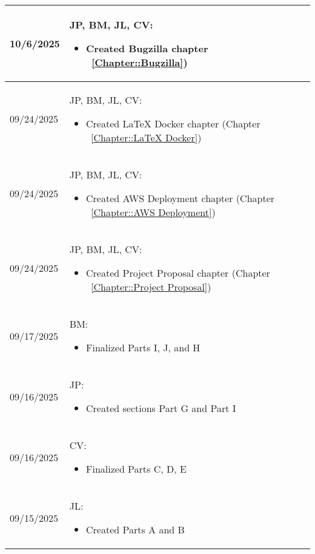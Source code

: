 \begin{longtable}{|l||p{13.5cm}|}
10/6/2025 & JP, BM, JL, CV:
\begin{itemize}[topsep=0pt,itemsep=0pt,parsep=0pt,partopsep=0pt,leftmargin=12pt]
\item Created Bugzilla chapter
~\ref{Chapter::Bugzilla})
\end{itemize} 
\\ \hline

09/24/2025 & JP, BM, JL, CV:
\begin{itemize}[topsep=0pt,itemsep=0pt,parsep=0pt,partopsep=0pt,leftmargin=12pt]
\item Created LaTeX Docker chapter (Chapter 
~\ref{Chapter::LaTeX Docker})
\end{itemize} 
\\ \hline

09/24/2025 & JP, BM, JL, CV:
\begin{itemize}[topsep=0pt,itemsep=0pt,parsep=0pt,partopsep=0pt,leftmargin=12pt]
\item Created AWS Deployment chapter (Chapter 
~\ref{Chapter::AWS Deployment})
\end{itemize} 
\\ \hline

09/24/2025 & JP, BM, JL, CV:
\begin{itemize}[topsep=0pt,itemsep=0pt,parsep=0pt,partopsep=0pt,leftmargin=12pt]
\item Created Project Proposal chapter (Chapter 
~\ref{Chapter::Project Proposal})
\end{itemize} 
\\ \hline

09/17/2025 & BM:
\begin{itemize}[topsep=0pt,itemsep=0pt,parsep=0pt,partopsep=0pt,leftmargin=12pt]
\item Finalized Parts I, J, and H

\end{itemize} 
\\ \hline

09/16/2025 & JP:
\begin{itemize}[topsep=0pt,itemsep=0pt,parsep=0pt,partopsep=0pt,leftmargin=12pt]
\item Created sections Part G and Part I

\end{itemize} 
\\ \hline

09/16/2025 & CV:
\begin{itemize}[topsep=0pt,itemsep=0pt,parsep=0pt,partopsep=0pt,leftmargin=12pt]
\item  Finalized Parts C, D, E
\end{itemize} 
\\ \hline

09/15/2025 & JL:
\begin{itemize}[topsep=0pt,itemsep=0pt,parsep=0pt,partopsep=0pt,leftmargin=12pt]
\item  Created Parts A and B
\end{itemize} 
\\ \hline

\end{longtable}



